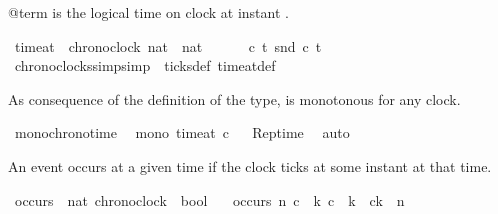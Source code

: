 \begin{isabellebody}
\begin{isamarkuptext}%
@term{} is the logical time on clock  at instant .%
\end{isamarkuptext}\isamarkuptrue%
\isamarkupfalse%
\ time{\isacharunderscore}at\ {\isacharcolon}{\isacharcolon}\ {\isacartoucheopen}{\isacharbrackleft}chronoclock{\isacharcomma}\ nat{\isacharbrackright}\ {\isasymRightarrow}\ nat{\isacartoucheclose}\ {\isacharparenleft}{\isacartoucheopen}{\isacharunderscore}\isactrlbsub {\isacharunderscore}\isactrlesub {\isacartoucheclose}\ {\isacharbrackleft}{}{}{\isacharcomma}\ {}{}{\isacharbrackright}{\isacharparenright}\isanewline
\ \ \ {\isacartoucheopen}{\isasymlambda}c\ t{\isachardot}\ {\isacharparenleft}snd\ c{\isacharparenright}\ t{\isacartoucheclose}%
\isadelimproof
\ %
\endisadelimproof
%
\isatagproof
\isacommand{{\isachardot}}\isamarkupfalse%
%
\endisatagproof
{\isafoldproof}%
%
\isadelimproof
%
\endisadelimproof
\isanewline
\isanewline
{}\isamarkupfalse%
\ chronoclocks{\isacharunderscore}simp{\isacharbrackleft}simp{\isacharbrackright}\ {\isacharequal}\ ticks{\isacharunderscore}def\ time{\isacharunderscore}at{\isacharunderscore}def%
\begin{isamarkuptext}%
As consequence of the definition of the  type, \isa{{\isacharparenleft}{\isasymnabla}{\isacharparenright}} is monotonous for any clock.%
\end{isamarkuptext}\isamarkuptrue%
\isamarkupfalse%
\ mono{\isacharunderscore}chronotime{\isacharcolon}\isanewline
\ \ {\isacartoucheopen}mono\ {\isacharparenleft}time{\isacharunderscore}at\ c{\isacharparenright}{\isacartoucheclose}%
\isadelimproof
\ %
\endisadelimproof
%
\isatagproof
{}\isamarkupfalse%
\ Rep{\isacharunderscore}time\ \isamarkupfalse%
\ auto%
\endisatagproof
{\isafoldproof}%
%
\isadelimproof
%
\endisadelimproof
%
\begin{isamarkuptext}%
An event occurs at a given time if the clock ticks at some instant at that time.%
\end{isamarkuptext}\isamarkuptrue%
\isamarkupfalse%
\ occurs\ {\isacharcolon}{\isacharcolon}\ {\isacartoucheopen}{\isacharbrackleft}nat{\isacharcomma}\ chronoclock{\isacharbrackright}\ {\isasymRightarrow}\ bool{\isacartoucheclose}\isanewline
\ \ \ {\isacartoucheopen}occurs\ n\ c\ {\isasymequiv}\ {\isasymexists}k{\isachardot}\ {\isacharparenleft}c\ {\isasymnabla}\ k\ {\isasymand}\ c\isactrlbsub k\isactrlesub \ {\isacharequal}\ n{\isacharparenright}{\isacartoucheclose}%

\end{isabellebody}
